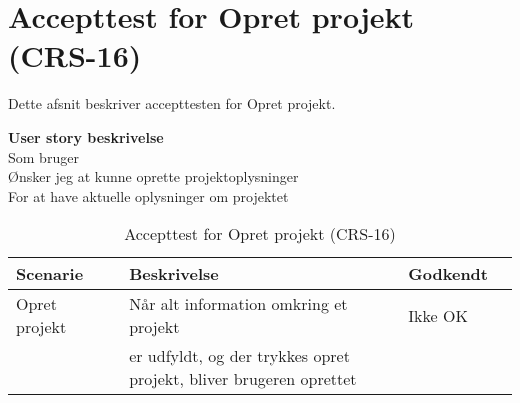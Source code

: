 \section{Accepttest for Opret projekt (CRS-16)}
Dette afsnit beskriver accepttesten for Opret projekt.

\textbf{User story beskrivelse} \\
Som bruger \\
Ønsker jeg at kunne oprette projektoplysninger \\
For at have aktuelle oplysninger om projektet

\begin{table}[H]
	\centering
	\begin{tabular}{|ll|l|ll|} \hline
		\textbf{Scenarie} &  & \textbf{Beskrivelse}&  \textbf{Godkendt}&  \\ \hline
		Opret projekt&  &  Når alt information omkring et projekt &  Ikke OK&  \\
		& & er udfyldt, og der trykkes opret projekt, bliver brugeren oprettet& & \\ \hline
	\end{tabular}
	\caption{Accepttest for Opret projekt (CRS-16)}
	\label{AcceptOpretProjekt}
\end{table}